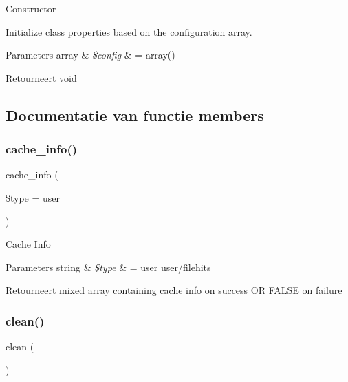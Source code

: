 Constructor

Initialize class properties based on the configuration array.


\begin{DoxyParams}[1]{Parameters}
array & {\em \$config} & = array() \\
\hline
\end{DoxyParams}
\begin{DoxyReturn}{Retourneert}
void 
\end{DoxyReturn}


\subsection{Documentatie van functie members}
\mbox{\label{class_c_i___cache_a26b8f7eef651dc3c0b5b9e1d8661a9ae}} 
\subsubsection{\texorpdfstring{cache\_info()}{cache\_info()}}
{\footnotesize\ttfamily cache\+\_\+info (\begin{DoxyParamCaption}\item[{}]{\$type = {\ttfamily \textquotesingle{}user\textquotesingle{}} }\end{DoxyParamCaption})}

Cache Info


\begin{DoxyParams}[1]{Parameters}
string & {\em \$type} & = \textquotesingle{}user\textquotesingle{} user/filehits \\
\hline
\end{DoxyParams}
\begin{DoxyReturn}{Retourneert}
mixed array containing cache info on success OR F\+A\+L\+SE on failure 
\end{DoxyReturn}
\mbox{\label{class_c_i___cache_adb40b812890a8bc058bf6b7a0e1a54d9}} 
\subsubsection{\texorpdfstring{clean()}{clean()}}
{\footnotesize\ttfamily clean (\begin{DoxyParamCaption}{ }\end{DoxyParamCaption})}

